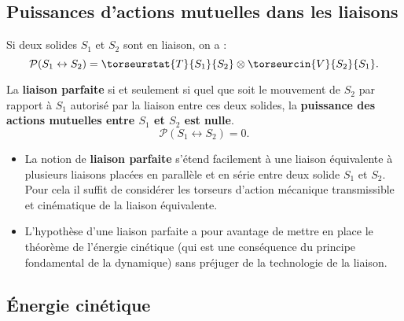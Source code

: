 \subsection{Puissances d'actions mutuelles dans les liaisons}
\begin{defi}
Si deux solides $S_1$ et $S_2$ sont en liaison, on a :
$$
\mathcal{P}(S_1 \leftrightarrow S_2) = \torseurstat{T}{S_1}{S_2}\otimes \torseurcin{V}{S_2}{S_1}.
$$

La \textbf{liaison parfaite} si et seulement si quel que soit le mouvement de $S_2$ par rapport à $S_1$ autorisé par la liaison entre ces deux solides, la \textbf{puissance des actions mutuelles entre $S_1$ et $S_2$ est nulle}.
$$
\mathcal{P}(S_1 \leftrightarrow S_2)=0.
$$
\end{defi}


\begin{remarque}%
\begin{itemize}
\item La notion de \textbf{liaison parfaite} s'étend facilement à une liaison équivalente à plusieurs liaisons placées en parallèle et en série entre deux solide $S_1$ et $S_2$. Pour cela il suffit de considérer les torseurs d'action mécanique transmissible et cinématique de la liaison équivalente.
\item L'hypothèse d'une liaison parfaite a pour avantage de mettre en place le théorème de l'énergie cinétique (qui est une conséquence du principe fondamental de la dynamique) sans préjuger de la technologie de la liaison.
\end{itemize}
\end{remarque}%


\subsection{Énergie cinétique}
%
%
%
%

